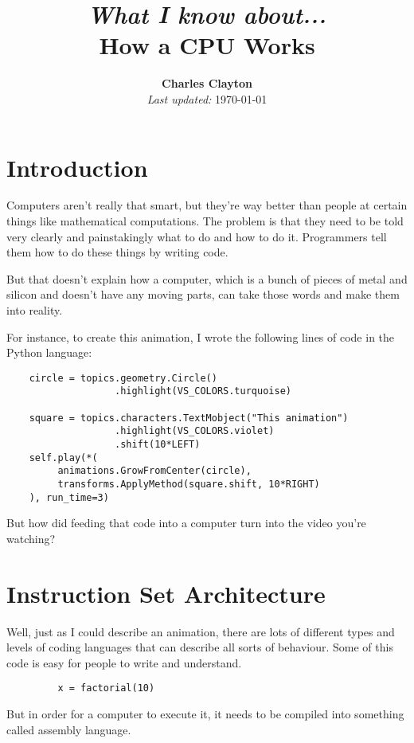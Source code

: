 \documentclass{IEEEtran}
\title{\small \textit{What I know about...} \\ \Huge How a CPU Works}
\author{\textbf{Charles Clayton} \\ \small \textit{Last updated:} \today}
\begin{document}
\maketitle


\section{Introduction}

Computers aren't really that smart, but they're way better than people at certain things like mathematical computations. The problem is that they need to be told very clearly and painstakingly what to do and how to do it. Programmers tell them how to do these things by writing code. 

But that doesn't explain how a computer, which is a bunch of pieces of metal and silicon and doesn't have any moving parts, can take those words and make them into reality. 

For instance, to create this animation, I wrote the following lines of code in the Python language:

\scriptsize
\begin{verbatim}
    circle = topics.geometry.Circle()
                   .highlight(VS_COLORS.turquoise)
                   
    square = topics.characters.TextMobject("This animation")
                   .highlight(VS_COLORS.violet)
                   .shift(10*LEFT)
    self.play(*(
         animations.GrowFromCenter(circle),
         transforms.ApplyMethod(square.shift, 10*RIGHT)
    ), run_time=3)      
\end{verbatim}
\normalsize

But how did feeding that code into a computer turn into the video you're watching?

\section{Instruction Set Architecture}

Well, just as I could describe an animation, there are lots of different types and levels of coding languages that can describe all sorts of behaviour. Some of this code is easy for people to write and understand. 

\scriptsize
\begin{verbatim}
         x = factorial(10)
\end{verbatim}
\normalsize

But in order for a computer to execute it, it needs to be compiled into something called assembly language. \medskip
\end{document}
